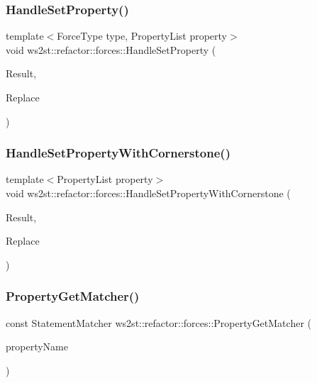 \subsubsection{\texorpdfstring{Handle\+Set\+Property()}{HandleSetProperty()}}
{\footnotesize\ttfamily template$<$Force\+Type type, Property\+List property$>$ \\
void ws2st\+::refactor\+::forces\+::\+Handle\+Set\+Property (\begin{DoxyParamCaption}\item[{const Match\+Finder\+::\+Match\+Result \&}]{Result,  }\item[{Replacements \&}]{Replace }\end{DoxyParamCaption})}

\mbox{\label{namespacews2st_1_1refactor_1_1forces_abf74b00f35cde6816132dbefb3210684}} 
\subsubsection{\texorpdfstring{Handle\+Set\+Property\+With\+Cornerstone()}{HandleSetPropertyWithCornerstone()}}
{\footnotesize\ttfamily template$<$Property\+List property$>$ \\
void ws2st\+::refactor\+::forces\+::\+Handle\+Set\+Property\+With\+Cornerstone (\begin{DoxyParamCaption}\item[{const Match\+Finder\+::\+Match\+Result \&}]{Result,  }\item[{Replacements \&}]{Replace }\end{DoxyParamCaption})}

\mbox{\label{namespacews2st_1_1refactor_1_1forces_afa3a7a5edfc5f3c897623b54beec66f3}} 
\subsubsection{\texorpdfstring{Property\+Get\+Matcher()}{PropertyGetMatcher()}}
{\footnotesize\ttfamily const Statement\+Matcher ws2st\+::refactor\+::forces\+::\+Property\+Get\+Matcher (\begin{DoxyParamCaption}\item[{const char $\ast$}]{property\+Name }\end{DoxyParamCaption})}

